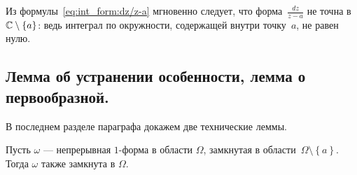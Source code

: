 \documentclass[../complex-analysis.tex]{subfiles}
\begin{document}
Из формулы~\eqref{eq:int_form:dz/z-a} мгновенно следует, что форма~$ \frac{dz}{z-a} $ не точна в $ \mathbb{C} \setminus \left\{ a \right\} $: ведь интеграл по окружности, содержащей внутри точку~$ a $, не равен нулю.

\subsection{Лемма об устранении особенности, лемма о первообразной.}

В последнем разделе параграфа докажем две технические леммы.

\begin{lm}
 \label{lemma:ob_ustranenii_osobennosti}
 Пусть $\omega$ --- непрерывная $1$-форма в области $\Omega$, замкнутая в области~$ \Omega \setminus \left\{ a \right\} $. Тогда $\omega$ также замкнута в $\Omega$.
\end{lm}
\end{document}
